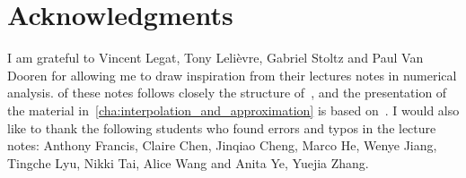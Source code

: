 \chapter*{Acknowledgments}%
\label{cha:acknowledgements}

I am grateful to Vincent Legat, Tony Lelièvre, Gabriel Stoltz and Paul Van Dooren for allowing me to draw inspiration from their lectures notes in numerical analysis.
 of these notes follows closely the structure of~\cite[Chapter 3]{VanDooren},
and the presentation of the material in~\cref{cha:interpolation_and_approximation} is based on~\cite{Legat}.
I would also like to thank the following students who found errors and typos in the lecture notes:
Anthony Francis, Claire Chen, Jinqiao Cheng, Marco He, Wenye Jiang, Tingche Lyu, Nikki Tai, Alice Wang and Anita Ye, Yuejia Zhang.
